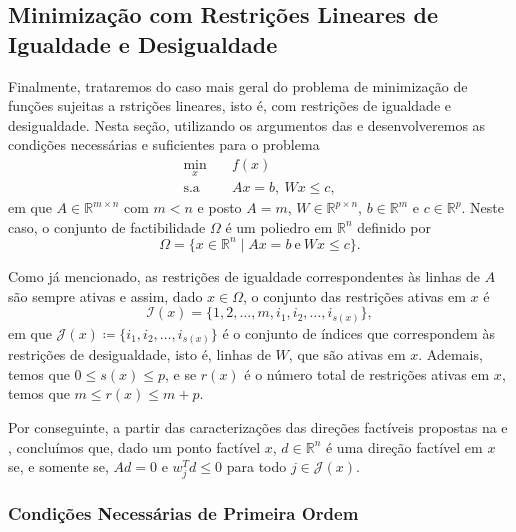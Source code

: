 \documentclass[12pt,a4paper]{scrartcl}
\def\RR{\mathds{R}}
\theoremstyle{definition}%
\begin{document}
\subsection{Minimização com Restrições Lineares de Igualdade e Desigualdade}

Finalmente, trataremos do caso mais geral do problema de minimização de funções sujeitas a rstrições lineares, isto é, com restrições de igualdade e desigualdade. Nesta seção, utilizando os argumentos das  e  desenvolveremos as condições necessárias e suficientes para o problema
\[ \label{problema_geral_minimizacao_igualdade_desigualdade}
\begin{aligned}
\min_{x} & \quad f(x) \\
\text{s.a} & \quad Ax = b, \ Wx \leq c,
\end{aligned}
\]
em que $A\in \RR^{m\times n}$ com $m<n$ e posto $A = m$, $W\in \RR^{p\times n}$, $b\in \RR^{m}$ e $c\in \RR^{p}$. Neste caso, o conjunto de factibilidade $\Omega$ é um poliedro em $\RR^{n}$ definido por 
\[
\Omega = \{ x\in \RR^{n} \mid Ax =b \ \text{e} \ Wx \leq c \}.
\]

Como já mencionado, as restrições de igualdade correspondentes às linhas de $A$ são sempre ativas e assim, dado $x\in \Omega$, o conjunto das restrições ativas em $x$ é
\[
\mathcal{I}(x) = \{ 1,2, \ldots ,m,i_{1} , i_{2} , \ldots , i_{s(x)} \} ,
\]
em que $\mathcal{J}(x) \coloneqq \{ i_{1} , i_{2} , \ldots , i_{s(x)} \}$ é o conjunto de índices que correspondem às restrições de desigualdade, isto é, linhas de $W$, que são ativas em $x$. Ademais, temos que $0\leq s(x) \leq p$, e se $r(x)$ é o número total de restrições ativas em $x$, temos que $m \leq r(x) \leq m+p$.

Por conseguinte, a partir das caracterizações das direções factíveis propostas na  e , concluímos que, dado um ponto factível $x$, $d\in \RR^{n}$ é uma direção factível em $x$ se, e somente se, $Ad =0$ e $w_{j}^{T}d \leq 0$ para todo $j\in \mathcal{J}(x)$.


\subsubsection{Condições Necessárias de Primeira Ordem}
\end{document}
